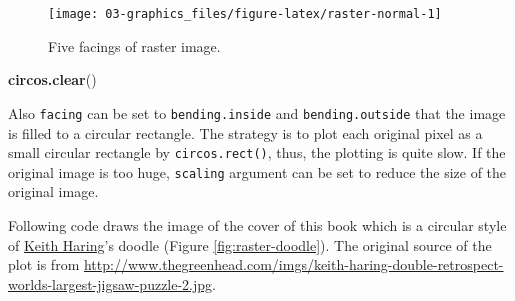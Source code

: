 \documentclass[]{book}
\newenvironment{Shaded}{\begin{snugshade}}{\end{snugshade}}
\newcommand{\KeywordTok}[1]{\textcolor[rgb]{0.13,0.29,0.53}{\textbf{#1}}}
\newcommand{\NormalTok}[1]{#1}
\theoremstyle{definition}
\theoremstyle{definition}
\theoremstyle{remark}
\begin{document}
\begin{figure}

{\centering \texttt{[image: 03-graphics\_files/figure-latex/raster-normal-1]} 

}

\caption{Five facings of raster image.}\label{fig:raster-normal}
\end{figure}

\begin{Shaded}
\begin{Highlighting}[]
\KeywordTok{circos.clear}\NormalTok{()}
\end{Highlighting}
\end{Shaded}

Also \texttt{facing} can be set to \texttt{bending.inside} and
\texttt{bending.outside} that the image is filled to a circular
rectangle. The strategy is to plot each original pixel as a small
circular rectangle by \texttt{circos.rect()}, thus, the plotting is
quite slow. If the original image is too huge, \texttt{scaling} argument
can be set to reduce the size of the original image.

Following code draws the image of the cover of this book which is a
circular style of
\href{https://en.wikipedia.org/wiki/Keith_Haring}{Keith Haring}'s doodle
(Figure \ref{fig:raster-doodle}). The original source of the plot is
from
\url{http://www.thegreenhead.com/imgs/keith-haring-double-retrospect-worlds-largest-jigsaw-puzzle-2.jpg}.
\end{document}
